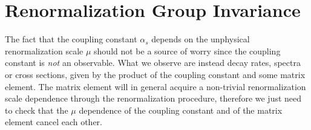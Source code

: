 \documentclass[../main.tex]{subfiles}
\begin{document}
\section{Renormalization Group Invariance}
The fact that the coupling constant $\alpha_s$ depends on the unphysical renormalization scale $\mu$ should not be a source of worry since the coupling constant is \textit{not} an observable. What we observe are instead decay rates, spectra or cross sections, given by the product of the coupling constant and some matrix element. The matrix element will in general acquire a non-trivial renormalization scale dependence through the renormalization procedure, therefore we just need to check that the $\mu$ dependence of the coupling constant and of the matrix element cancel each other.
\end{document}
